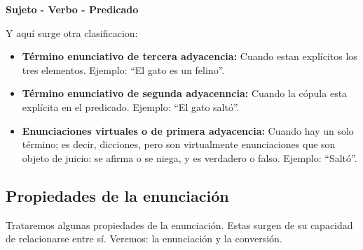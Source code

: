 \documentclass{article}
\begin{document}
   \begin{center}
       \textbf{Sujeto - Verbo - Predicado} \\
   \end{center}
  Y aquí surge otra clasificacion:\\
  \begin{itemize}
      \item \textbf{Término enunciativo de tercera adyacencia:} Cuando estan explícitos los tres elementos. Ejemplo: ``El gato es un felino''.
      \item \textbf{Término enunciativo de segunda adyacenncia:} Cuando la cópula esta explícita en el predicado. Ejemplo: ``El gato saltó''.
      \item \textbf{Enunciaciones virtuales o de primera adyacencia:} Cuando hay un solo término; es decir, dicciones, pero son virtualmente enunciaciones que son objeto de juicio: se afirma o se niega, y es verdadero o falso. Ejemplo: ``Saltó''.
  \end{itemize}
 
\subsection{Propiedades de la enunciación}

    Trataremos algunas propiedades de la enunciación. Estas surgen de su capacidad de relacionarse entre sí. Veremos: la enunciación y la conversión.
    
\end{document}
